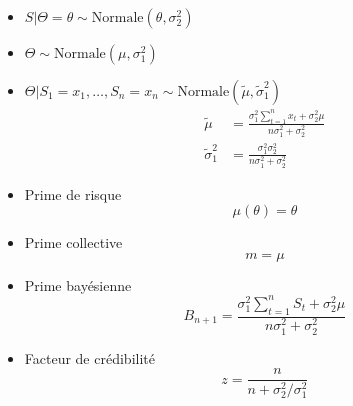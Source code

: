 \begin{itemize}
\item $S|\Theta = \theta \sim \text{Normale}(\theta, \sigma_2^2)$
\item $\Theta \sim \text{Normale}(\mu, \sigma_1^2)$
\item $\Theta|S_1 = x_1, \dots, S_n = x_n \sim
  \text{Normale}(\tilde{\mu}, \tilde{\sigma}_1^2)$
  \begin{align*}
    \tilde{\mu} &=
      \frac{\sigma_1^2 \sum_{t = 1}^n x_t + \sigma_2^2 \mu}{n \sigma_1^2 +
        \sigma_2^2} \\
    \tilde{\sigma}_1^2 &= \frac{\sigma_1^2 \sigma_2^2}{n
        \sigma_1^2 + \sigma_2^2}
  \end{align*}
\item Prime de risque
  \begin{equation*}
    \mu(\theta) = \theta
  \end{equation*}
\item Prime collective
  \begin{equation*}
    m = \mu
  \end{equation*}
\item Prime bayésienne
  \begin{equation*}
    B_{n + 1} =
      \frac{\sigma_1^2 \sum_{t = 1}^n S_t + \sigma_2^2 \mu}{n \sigma_1^2 +
        \sigma_2^2}
  \end{equation*}
\item Facteur de crédibilité
  \begin{equation*}
    z = \frac{n}{n + \sigma_2^2/\sigma_1^2}
  \end{equation*}
\end{itemize}

\endgroup

